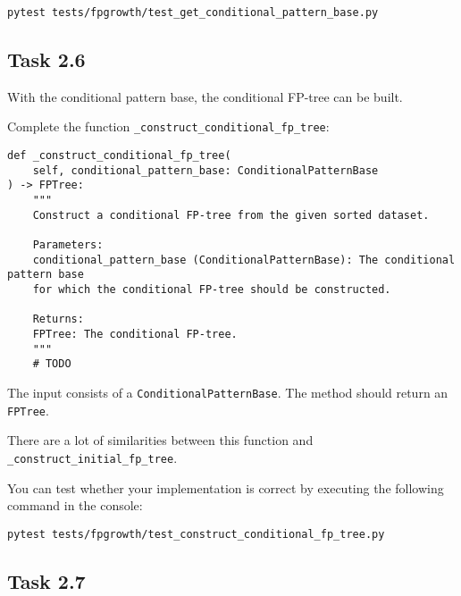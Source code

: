\documentclass[
english,
smallborders
]{i6prcsht}
\begin{document}
\vspace*{0.3cm}

\begin{lstlisting}
pytest tests/fpgrowth/test_get_conditional_pattern_base.py
\end{lstlisting}

\vspace*{0.1cm}


\subsection*{Task 2.6}

With the conditional pattern base, the conditional FP-tree can be built.

Complete the function \texttt{\_construct\_conditional\_fp\_tree}:

\vspace*{0.3cm}

\begin{lstlisting}
def _construct_conditional_fp_tree(
	self, conditional_pattern_base: ConditionalPatternBase
) -> FPTree:
	"""
	Construct a conditional FP-tree from the given sorted dataset.

	Parameters:
	conditional_pattern_base (ConditionalPatternBase): The conditional pattern base
	for which the conditional FP-tree should be constructed.

	Returns:
	FPTree: The conditional FP-tree.
	"""
	# TODO
\end{lstlisting}

\vspace*{0.1cm}

The input consists of a \texttt{ConditionalPatternBase}. The method should return an \texttt{FPTree}.

There are a lot of similarities between this function and \texttt{\_construct\_initial\_fp\_tree}.

You can test whether your implementation is correct by executing the following command in the console:

\vspace*{0.3cm}

\begin{lstlisting}
pytest tests/fpgrowth/test_construct_conditional_fp_tree.py
\end{lstlisting}

\vspace*{0.1cm}

\subsection*{Task 2.7}
\end{document}
